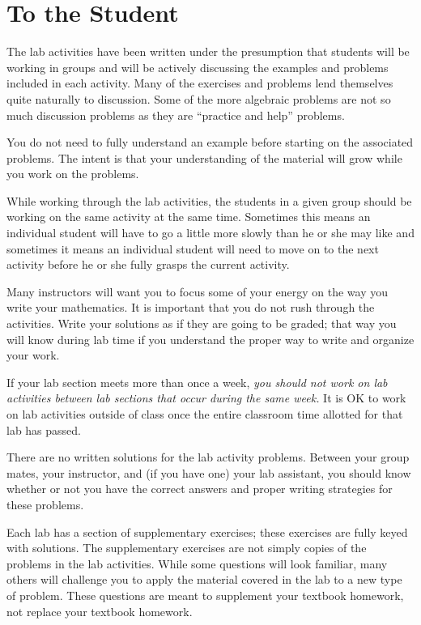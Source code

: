 \documentclass[12pt,]{book}
\theoremstyle{plain}
\theoremstyle{definition}
\theoremstyle{definition}
\theoremstyle{definition}
\theoremstyle{definition}
\theoremstyle{definition}
\numberwithin{equation}{section}
\begin{document}
\chapter*{To the Student}\label{to-the-student}
The lab activities have been written under the presumption that students will be working in groups and will be actively discussing the examples and problems included in each activity. Many of the exercises and problems lend themselves quite naturally to discussion. Some of the more algebraic problems are not so much discussion problems as they are ``practice and help'' problems.%
\par
You do not need to fully understand an example before starting on the associated problems. The intent is that your understanding of the material will grow while you work on the problems.%
\par
While working through the lab activities, the students in a given group should be working on the same activity at the same time. Sometimes this means an individual student will have to go a little more slowly than he or she may like and sometimes it means an individual student will need to move on to the next activity before he or she fully grasps the current activity.%
\par
Many instructors will want you to focus some of your energy on the way you write your mathematics. It is important that you do not rush through the activities. Write your solutions as if they are going to be graded; that way you will know during lab time if you understand the proper way to write and organize your work.%
\par
If your lab section meets more than once a week, \emph{you should not work on lab activities between lab sections that occur during the same week.} It is OK to work on lab activities outside of class once the entire classroom time allotted for that lab has passed.%
\par
There are no written solutions for the lab activity problems. Between your group mates, your instructor, and (if you have one) your lab assistant, you should know whether or not you have the correct answers and proper writing strategies for these problems.%
\par
Each lab has a section of supplementary exercises; these exercises are fully keyed with solutions. The supplementary exercises are not simply copies of the problems in the lab activities. While some questions will look familiar, many others will challenge you to apply the material covered in the lab to a new type of problem. These questions are meant to supplement your textbook homework, not replace your textbook homework.%
\end{document}
